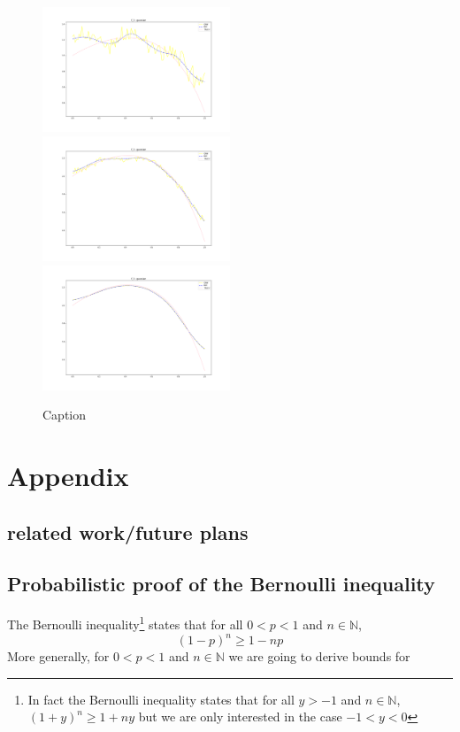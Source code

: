 \documentclass{article}
\begin{document}
\begin{figure}
    \centering
    \includegraphics[width=0.5\textwidth]{SSLAN_f_3_gaussian.png}
    \includegraphics[width=0.5\textwidth]{MSMN_f_3_gaussian.png}
    \includegraphics[width=0.5\textwidth]{LSLN_f_3_gaussian.png}
    \caption{Caption}
    \label{fig:my_label}
\end{figure}


\section{Appendix}

\subsection{related work/future plans}

\subsection{Probabilistic proof of the Bernoulli inequality}

The Bernoulli inequality\footnote{In fact the Bernoulli inequality states that for all $y>-1$ and $n\in\mathbb{N}$, $(1+y)^n\geq 1+ny$ but we are only interested in the case $-1<y<0$} states that for all $0<p<1$ and $n\in\mathbb{N}$, 
\begin{equation}
\label{bern_ineq}
    (1-p)^n\geq 1-np
\end{equation}
More generally, for $0<p<1$ and $n\in\mathbb{N}$ we are going to derive bounds for
\end{document}
